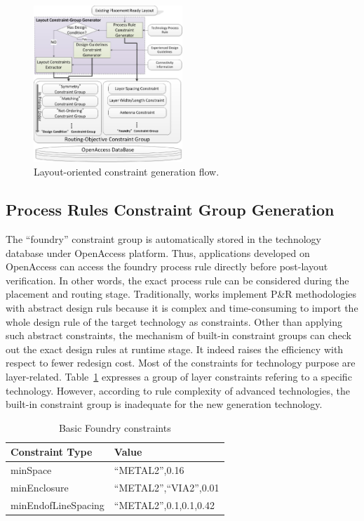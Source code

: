     \begin{figure}[t]
      \centering
        \includegraphics[width=0.5\textwidth]{Fig/Chapter3/LayoutConGen.eps}
        \caption{Layout-oriented constraint generation flow.}
        \label{fig:LayoutCGGen}
    \end{figure}

    \subsection{Process Rules Constraint Group Generation}\label{sec:RCG}
    
      The ``foundry'' constraint group is automatically stored in the technology database under OpenAccess platform. Thus, applications developed on OpenAccess can access the foundry process rule directly before post-layout verification. In other words, the exact process rule can be considered during the placement and routing stage. Traditionally, works implement P\&R methodologies with abstract design ruls because it is complex and time-consuming to import the whole design rule of the target technology as constraints. Other than applying such abstract constraints, the mechanism of built-in constraint groups can check out the exact design rules at runtime stage. It indeed raises the efficiency with respect to fewer redesign cost. Most of the constraints for technology purpose are layer-related. Table~\ref{tableFoundryCon} expresses a group of layer constraints refering to a specific technology. However, according to rule complexity of advanced technologies, the built-in constraint group is inadequate for the new generation technology. 
    
      \begin{table}[ht]
        \centering
        \caption{Basic Foundry constraints}\label{tableFoundryCon}
        \begin{scriptsize}
          \begin{tabular}[t]{|l|l|}
            \hline
            Constraint Type & Value \\
            \hline
            minSpace  & ``METAL2'',0.16 \\
            \hline
            minEnclosure  & ``METAL2'',``VIA2'',0.01  \\
            \hline
            minEndofLineSpacing & ``METAL2'',0.1,0.1,0.42 \\
            \hline
          \end{tabular}
        \end{scriptsize}
      \end{table}
    
